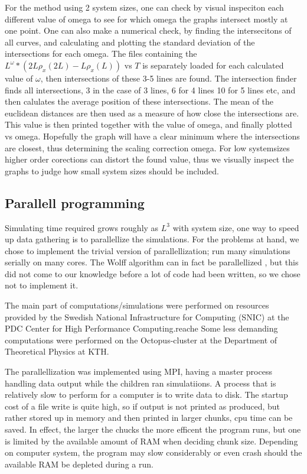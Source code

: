 For the method using 2 system sizes, one can check by visual inspeciton each different value of omega to see for which omega the graphs intersect mostly at one point. One can also make a numerical check, by finding the intersecitons of all curves, and calculating  and plotting the standard deviation of the intersections for each omega.
The files containing the $L^{\omega}*(2L\rho_x(2L) - L\rho_x(L))$ vs $T$ is separately loaded for each calculated value of $\omega$, then intersections of these 3-5 lines are found. 
The intersection finder finds all intersections, 3 in the case of 3 lines, 6 for 4 lines 10 for 5 lines etc, and then calulates the average position of these intersections. The mean of the euclidean distances are then used as a measure of how close the intersections are. This value is then printed together with the value of omega, and finally plotted vs omega.
Hopefully the graph will have a clear minimum where the intersections are closest, thus determining the scaling correction omega. For low systemsizes higher order corections can distort the found value, thus we visually inspect the graphs to judge how small system sizes should be included. 

\subsection{Parallell programming}
Simulating time required grows roughly as $L^3$ with system size, one way to speed up data gathering is to parallellize the simulations. For the problems at hand, we chose to implement the trivial version of parallellization; run many simulations serially on many cores. The Wolff algorithm can in fact be parallellized \cite{Kaupuzs2010}, but this did not come to our knowledge before a lot of code had been written, so we chose not to implement it. 

The main part of computations/simulations were performed on resources provided by the Swedish National Infrastructure for Computing (SNIC) at the PDC Center for High Performance Computing.reache
Some less demanding computations were performed on the Octopus-cluster at the Department of Theoretical Physics at KTH.

The parallellization was implemented using MPI, having a master process handling data output while the children ran simulatiions. A process that is relatively slow to perform for a computer is to write data to disk. 
The startup cost of a file write is quite high, so if output is not printed as produced, but rather stored up in memory and then printed in larger chunks, cpu time can be saved. 
In effect, the larger the chucks the more efficent the program runs, but one is limited by the available amount of RAM when deciding chunk size. Depending on computer system, the program may slow considerably or even crash should the available RAM be depleted during a run.
